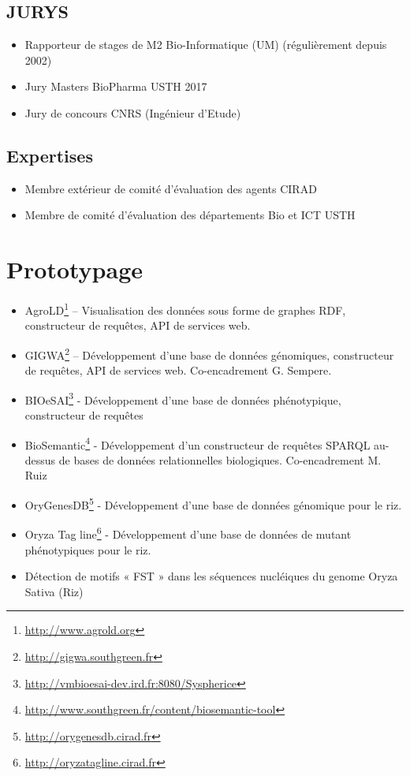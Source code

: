 \subsection*{JURYS}
\begin{itemize}
\item Rapporteur de stages de M2 Bio-Informatique (UM) (régulièrement depuis 2002)
\item Jury Masters BioPharma USTH 2017
\item Jury de concours CNRS (Ingénieur d’Etude)
\end{itemize}

\subsection*{Expertises}
\begin{itemize}
\item Membre extérieur de comité d’évaluation des agents CIRAD
\item Membre de comité d'évaluation des départements Bio et ICT USTH
\end{itemize}


\section{Prototypage}
\begin{itemize}
\item  AgroLD\footnote{\url{http://www.agrold.org}} – Visualisation des données sous forme de graphes RDF, constructeur de requêtes, API de services web.
% 
\item GIGWA\footnote{\url{http://gigwa.southgreen.fr}}  – Développement d’une base de données génomiques, constructeur de requêtes, API de services web. Co-encadrement G. Sempere.
% 
\item BIOeSAI\footnote{\url{http://vmbioesai-dev.ird.fr:8080/Syspherice}} - Développement d’une base de données phénotypique, constructeur de requêtes 
\item BioSemantic\footnote{\url{http://www.southgreen.fr/content/biosemantic-tool}} - Développement d’un constructeur de requêtes SPARQL au-dessus de bases de données relationnelles biologiques. Co-encadrement M. Ruiz
%
\item OryGenesDB\footnote{\url{ http://orygenesdb.cirad.fr}} - Développement d’une base de données génomique pour le riz.
\item Oryza Tag line\footnote{\url{http://oryzatagline.cirad.fr}} - Développement d’une base de données de mutant phénotypiques pour le riz.  
\item Détection de motifs « FST » dans les séquences nucléiques du genome Oryza Sativa (Riz)
\end{itemize}
%